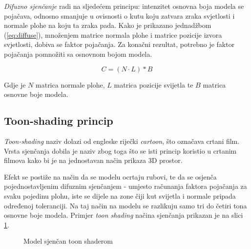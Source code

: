 \emph{Difuzno sjenčanje} radi na sljedećem principu: intenzitet osnovna boja modela se pojačava, odnosno smanjuje u ovisnosti o kutu koju zatvara zraka svjetlosti i normale plohe na koju ta zraka pada. Kako je prikazano jednadžbom (\ref{eq:diffuse}), množenjem matrice normala plohe i matrice pozicije izvora svjetlosti, dobiva se faktor pojačanja. Za konačni rezultat, potrebno je faktor pojačanja pomnožiti sa osnovnom bojom modela.

\begin{equation}
\label{eq:diffuse}
C = (N \cdot L) * B
\end{equation}

Gdje je $N$ matrica normale plohe, $L$ matrica pozicije svijetla te $B$ matrica osnovne boje modela. 

\subsection{Toon-shading princip}

\emph{Toon-shading} naziv dolazi od engleske riječki \emph{cartoon}, što označava crtani film. Vrsta sjenčanja dobila je naziv zbog toga što se isti princip koristio u crtanim filmova kako bi je na jednostavan način prikaza 3D prostor.

Efekt se postiže na način da se modelu ocrtaju rubovi, te da se osjenča pojednostavljenim difuznim sjenčanjem - umjesto računanja faktora pojačanja za svaku pojedinu plohu, iste se dijele na zone čiji kut svijetla i normale pripada određenoj toleranciji. Na taj način na modelu se razlikuju samo tri do četiri tona osnovne boje modela. Primjer \emph{toon shading} načina sjenčanja prikazan je na slici \ref{fig:monkey-toonshaded}.

\begin{figure}[H]
\centering{}
\caption{Model sjenčan toon shaderom}
\label{fig:monkey-toonshaded}
\end{figure}

